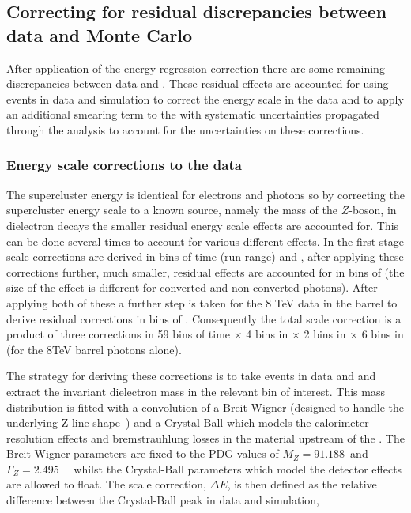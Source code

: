 \subsection{Correcting for residual discrepancies between data and Monte Carlo}
\label{sec:scale_smearing}

After application of the energy regression correction there are some remaining discrepancies between data and \MC. These residual effects are accounted for using \Zee events in data and simulation to correct the energy scale in the data and to apply an additional smearing term to the \MC with systematic uncertainties propagated through the analysis to account for the uncertainties on these corrections.

\subsubsection{Energy scale corrections to the data}

The supercluster energy is identical for electrons and photons so by correcting the supercluster energy scale to a known source, namely the mass of the $Z$-boson, in dielectron decays the smaller residual energy scale effects are accounted for. This can be done several times to account for various different effects. In the first stage scale corrections are derived in bins of time (run range) and \eta, after applying these corrections further, much smaller, residual effects are accounted for in bins of \rnine (the size of the effect is different for converted and non-converted photons). After applying both of these a further step is taken for the 8 TeV data in the barrel to derive residual corrections in bins of \ET. Consequently the total scale correction is a product of three corrections in 59 bins of time $\times$ 4 bins in \eta $\times$ 2 bins in \rnine $\times$ 6 bins in \ET (for the 8TeV barrel photons alone).

The strategy for deriving these corrections is to take \Zee events in data and \MC and extract the invariant dielectron mass in the relevant bin of interest. This mass distribution is fitted with a convolution of a Breit-Wigner (designed to handle the underlying Z line shape~\cite{pdg}) and a Crystal-Ball which models the calorimeter resolution effects and bremstrauhlung losses in the material upstream of the \ECAL. The Breit-Wigner parameters are fixed to the PDG values of $M_{Z}=91.188$~\GeV and $\Gamma_{Z}=2.495$~\GeV~\cite{pdg} whilst the Crystal-Ball parameters which model the detector effects are allowed to float. The scale correction, $\Delta E$, is then defined as the relative difference between the Crystal-Ball peak in data and simulation,

